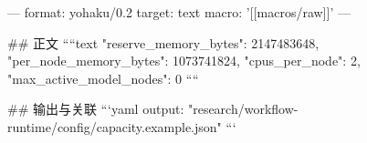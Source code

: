 ---
format: yohaku/0.2
target: text
macro: '[[macros/raw]]'
---

## 正文
````text
{
  "reserve_memory_bytes": 2147483648,
  "per_node_memory_bytes": 1073741824,
  "cpus_per_node": 2,
  "max_active_model_nodes": 0
}
````

## 输出与关联
```yaml
output: "research/workflow-runtime/config/capacity.example.json"
```
